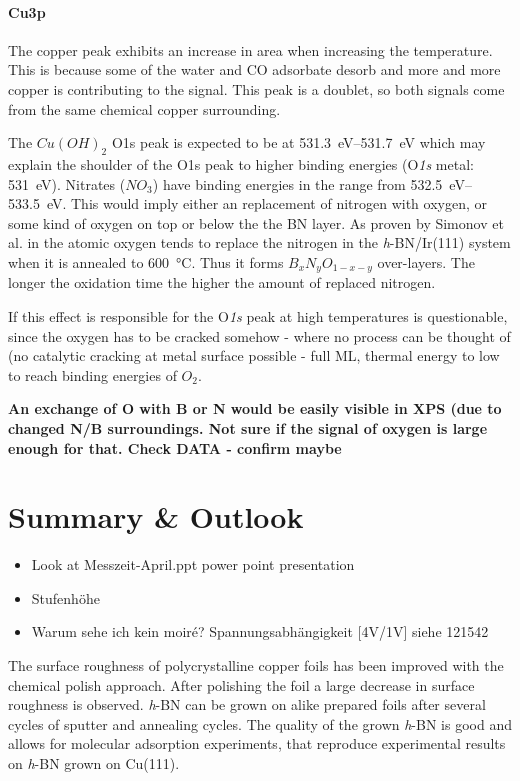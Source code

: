 \paragraph{Cu3p}
The copper peak exhibits an increase in area when increasing the temperature. This is because some of the water and CO adsorbate desorb and more and more copper is contributing to the signal. This peak is a doublet, so both signals come from the same chemical copper surrounding.


The $Cu(OH)_2$ O1s peak is expected to be at \SIrange{531.3}{531.7}{\eV}\cite{deroubaix_x-ray_1992} which may explain the shoulder of the O1s peak to higher binding energies (O\textit{1s} metal: \SI{531}{\eV}). Nitrates ($NO_3$) have binding energies in the range from \SIrange{532.5}{533.5}{\eV}\cite[45]{wanger_handbook_1979}. This would imply either an replacement of nitrogen with oxygen, or some kind of oxygen on top or below the the BN layer. As proven by Simonov et al. in \cite{simonov_controllable_2012} the atomic oxygen tends to replace the nitrogen in the \textit{h}-BN/Ir(111) system when it is annealed to \SI{600}{\degreeCelsius}. Thus it forms $B_{x}N_{y}O_{1-x-y}$ over-layers. The longer the oxidation time the higher the amount of replaced nitrogen. 

If this effect is responsible for the O\textit{1s} peak at high temperatures is questionable, since the oxygen has to be cracked somehow - where no process can be thought of (no catalytic cracking at metal surface possible - full ML, thermal energy to low to reach binding energies of $O_2$.

\textbf{An exchange of O with B or N would be easily visible in XPS (due to changed N/B surroundings. Not sure if the signal of oxygen is large enough for that. Check DATA - confirm maybe}

\section{Summary \& Outlook}
  \begin{itemize}
	\item Look at Messzeit-April.ppt power point presentation
	\item Stufenh\"ohe
	\item Warum sehe ich kein moir\'e? Spannungsabhängigkeit [4V/1V] siehe 121542
\end{itemize}

The surface roughness of polycrystalline copper foils has been improved with the chemical polish approach. After polishing the foil a large decrease in surface roughness is observed. \textit{h}-BN can be grown on alike prepared foils after several cycles of sputter and annealing cycles. The quality of the grown \textit{h}-BN is good and allows for molecular adsorption experiments, that reproduce experimental results on \textit{h}-BN grown on Cu(111).

